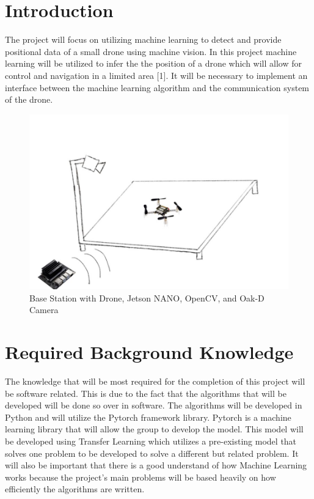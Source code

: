\documentclass[12pt,onecolumn]{IEEEtran}			%
\begin{document}
 
 \section{Introduction}
The project will focus on utilizing machine learning to detect and provide positional data of a small drone using machine vision. In this project machine learning will be utilized to infer the the position of a drone which will allow for control and navigation in a limited area [1]. It will be necessary to implement an interface between the machine learning algorithm and the communication system of the drone. \\

\begin{figure}[hp]
    \centering
    \includegraphics[width=12cm]{Images/senior design figure.PNG} 
    \caption{Base Station with Drone, Jetson NANO, OpenCV, and Oak-D Camera}
    \label{fig:project_overview}
\end{figure}


\section{Required Background Knowledge}
The knowledge that will be most required for the completion of this project will be software related. This is due to the fact that the algorithms that will be developed will be done so over in software. The algorithms will be developed in Python and will utilize the Pytorch framework library. Pytorch is a machine learning library that will allow the group to develop the model. This model will be developed using Transfer Learning which utilizes a pre-existing model that solves one problem to be developed to solve a different but related problem. It will also be important that there is a good understand of how Machine Learning works because the project's main problems will be based heavily on how efficiently the algorithms are written. 
\end{document}

